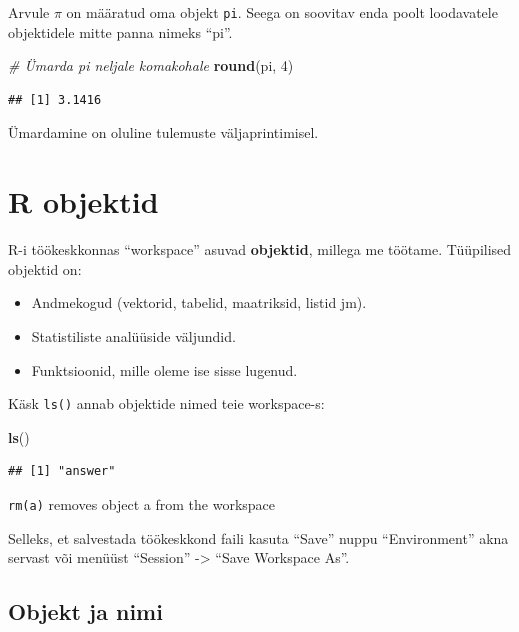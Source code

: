 \documentclass[]{book}
\newenvironment{Shaded}{\begin{snugshade}}{\end{snugshade}}
\newcommand{\KeywordTok}[1]{\textcolor[rgb]{0.13,0.29,0.53}{\textbf{#1}}}
\newcommand{\DecValTok}[1]{\textcolor[rgb]{0.00,0.00,0.81}{#1}}
\newcommand{\CommentTok}[1]{\textcolor[rgb]{0.56,0.35,0.01}{\textit{#1}}}
\newcommand{\NormalTok}[1]{#1}
\providecommand{\tightlist}{%
  \setlength{\itemsep}{0pt}\setlength{\parskip}{0pt}}
\begin{document}
Arvule \(\pi\) on määratud oma objekt \texttt{pi}. Seega on soovitav
enda poolt loodavatele objektidele mitte panna nimeks ``pi''.

\begin{Shaded}
\begin{Highlighting}[]
\CommentTok{# Ümarda pi neljale komakohale}
\KeywordTok{round}\NormalTok{(pi, }\DecValTok{4}\NormalTok{)}
\end{Highlighting}
\end{Shaded}

\begin{verbatim}
## [1] 3.1416
\end{verbatim}

Ümardamine on oluline tulemuste väljaprintimisel.

\section{R objektid}\label{r-objektid}

R-i töökeskkonnas ``workspace'' asuvad \textbf{objektid}, millega me
töötame. Tüüpilised objektid on:

\begin{itemize}
\tightlist
\item
  Andmekogud (vektorid, tabelid, maatriksid, listid jm).
\item
  Statistiliste analüüside väljundid.
\item
  Funktsioonid, mille oleme ise sisse lugenud.
\end{itemize}

Käsk \texttt{ls()} annab objektide nimed teie workspace-s:

\begin{Shaded}
\begin{Highlighting}[]
\KeywordTok{ls}\NormalTok{()}
\end{Highlighting}
\end{Shaded}

\begin{verbatim}
## [1] "answer"
\end{verbatim}

\texttt{rm(a)} removes object a from the workspace

Selleks, et salvestada töökeskkond faili kasuta ``Save'' nuppu
``Environment'' akna servast või menüüst ``Session'' -\textgreater{}
``Save Workspace As''.

\subsection{Objekt ja nimi}\label{objekt-ja-nimi}
\end{document}
